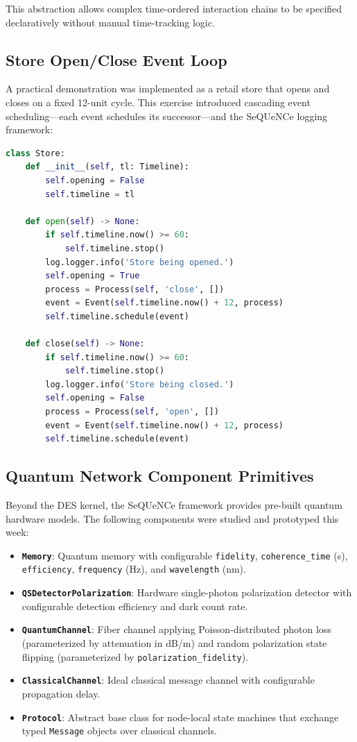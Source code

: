 \documentclass[12pt,oneside,letterpaper,english]{article}
\begin{document}
This abstraction allows complex time-ordered interaction chains to be specified declaratively without manual time-tracking logic.

\subsection{Store Open/Close Event Loop}

A practical demonstration was implemented as a retail store that opens and closes on a fixed 12-unit cycle. This exercise introduced cascading event scheduling—each event schedules its successor—and the SeQUeNCe logging framework:

\begin{lstlisting}[language=Python, caption={Self-scheduling DES event loop (DES/des.py)}]
class Store:
    def __init__(self, tl: Timeline):
        self.opening = False
        self.timeline = tl

    def open(self) -> None:
        if self.timeline.now() >= 60:
            self.timeline.stop()
        log.logger.info('Store being opened.')
        self.opening = True
        process = Process(self, 'close', [])
        event = Event(self.timeline.now() + 12, process)
        self.timeline.schedule(event)

    def close(self) -> None:
        if self.timeline.now() >= 60:
            self.timeline.stop()
        log.logger.info('Store being closed.')
        self.opening = False
        process = Process(self, 'open', [])
        event = Event(self.timeline.now() + 12, process)
        self.timeline.schedule(event)
\end{lstlisting}

\subsection{Quantum Network Component Primitives}

Beyond the DES kernel, the SeQUeNCe framework provides pre-built quantum hardware models. The following components were studied and prototyped this week:

\begin{itemize}
    \item \textbf{\texttt{Memory}}: Quantum memory with configurable \texttt{fidelity}, \texttt{coherence\_time} (s), \texttt{efficiency}, \texttt{frequency} (Hz), and \texttt{wavelength} (nm).
    \item \textbf{\texttt{QSDetectorPolarization}}: Hardware single-photon polarization detector with configurable detection efficiency and dark count rate.
    \item \textbf{\texttt{QuantumChannel}}: Fiber channel applying Poisson-distributed photon loss (parameterized by attenuation in dB/m) and random polarization state flipping (parameterized by \texttt{polarization\_fidelity}).
    \item \textbf{\texttt{ClassicalChannel}}: Ideal classical message channel with configurable propagation delay.
    \item \textbf{\texttt{Protocol}}: Abstract base class for node-local state machines that exchange typed \texttt{Message} objects over classical channels.
\end{itemize}
\end{document}
